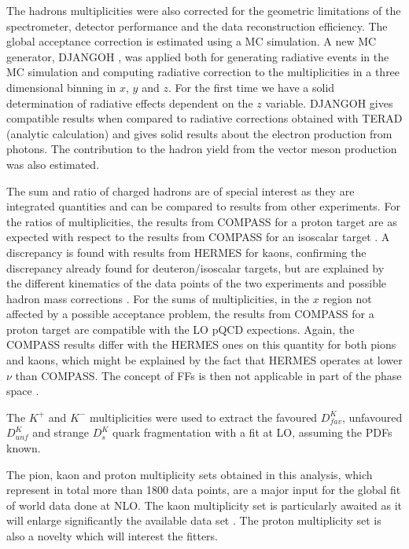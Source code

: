 The hadrons multiplicities were also corrected for the geometric limitations of the spectrometer, detector performance and the data reconstruction efficiency. The global acceptance correction is estimated using a MC simulation. A new MC generator, DJANGOH \cite{DJANGOH,DJANGOHnote}, was applied both for generating radiative events in the MC simulation and computing radiative correction to the multiplicities in a three dimensional binning in $x$, $y$ and $z$. For the first time we have a solid determination of radiative effects dependent on the $z$ variable. DJANGOH gives compatible results when compared to radiative corrections obtained with TERAD (analytic calculation) and gives solid results about the electron production from photons. The contribution to the hadron yield from the vector meson production was also estimated.

The sum and ratio of charged hadrons are of special interest as they are integrated quantities and can be compared to results from other experiments. For the ratios of multiplicities, the results from COMPASS for a proton target are as expected with respect to the results from COMPASS for an isoscalar target \cite{COMPASS2006Pi,COMPASS2006K}. A discrepancy is found with results from HERMES \cite{HERMESMult} for kaons, confirming the discrepancy already found for deuteron/isoscalar targets, but are explained by the different kinematics of the data points of the two experiments and possible hadron mass corrections \cite{Accardi,MarcinPubli}. For the sums of multiplicities, in the $x$ region not affected by a possible acceptance problem, the results from COMPASS for a proton target are compatible with the LO pQCD expections. Again, the COMPASS results differ with the HERMES ones on this quantity for both pions and kaons, which might be explained by the fact that HERMES operates at lower $\nu$ than COMPASS. The concept of FFs is then not applicable in part of the phase space \cite{MarcinPubli}.

The $K^+$ and $K^-$ multiplicities were used to extract the favoured $D^{K}_{fav}$, unfavoured $D^{K}_{unf}$ and strange $D^{K}_{s}$ quark fragmentation with a fit at LO, assuming the PDFs known.

The pion, kaon and proton multiplicity sets obtained in this analysis, which represent in total more than 1800 data points, are a major input for the global fit of world data done at NLO. The kaon multiplicity set is particularly awaited as it will enlarge significantly the available data set \cite{DIS2019}. The proton multiplicity set is also a novelty which will interest the fitters.

